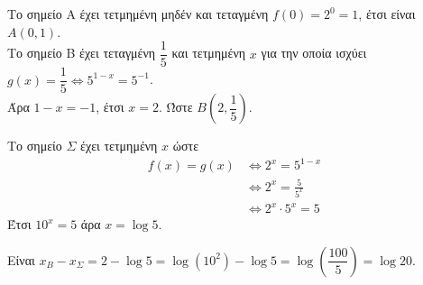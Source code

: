 \begin{alist}
\item Το σημείο Α έχει τετμημένη μηδέν και τεταγμένη $f(0) = 2^0 = 1$, έτσι είναι $A(0,1)$. \\
Το σημείο Β έχει τεταγμένη $\dfrac{1}{5}$ και τετμημένη $x$ για την οποία ισχύει $g(x) = \dfrac{1}{5} \Leftrightarrow 5^{1-x} = 5^{-1}$. \\
Άρα $1 - x = -1$, έτσι $x = 2$. Ώστε $B\left(2, \dfrac{1}{5}\right)$.
\item Το σημείο $\Sigma$ έχει τετμημένη $x$ ώστε 
\begin{align*}
f(x) = g(x) &\Leftrightarrow 2^x = 5^{1-x} \\
&\Leftrightarrow 2^x = \frac{5}{5^x} \\
&\Leftrightarrow 2^x \cdot 5^x = 5
\end{align*}
Έτσι $10^x = 5$ άρα $x = \log 5$.
\item Είναι $x_B - x_{\Sigma} = 2 - \log 5 = \log(10^2) - \log 5 = \log\left(\dfrac{100}{5}\right) = \log 20$.
\end{alist}

